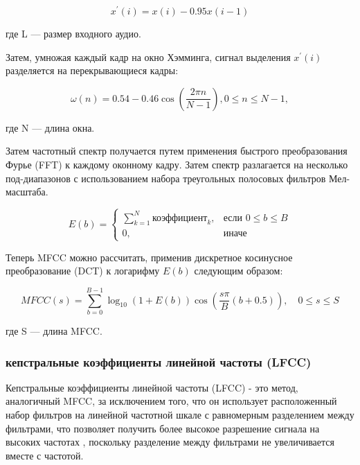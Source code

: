 \begin{equation}
    {x^'}(i) = x(i) - 0.95x(i-1)
\end{equation}

где L — размер входного аудио.

Затем, умножая каждый кадр на окно Хэмминга, сигнал выделения \({x^'}(i)\) разделяется на перекрывающиеся кадры:

\begin{equation}
    \omega(n) = 0.54 - 0.46 \cos(\frac{2 \pi n}{N - 1}), 0 \leq n \leq N - 1,
\end{equation}

где N — длина окна.

Затем частотный спектр получается путем применения быстрого преобразования Фурье (FFT) к каждому оконному кадру. Затем спектр разлагается на несколько под-диапазонов с использованием набора треугольных полосовых фильтров Мел-масштаба.

\begin{equation}
    E(b) = \left\{
    \begin{array}{ll}
    \sum_{k=1}^{N} \text{коэффициент}_k, & \text{если } 0 \leq b \leq B \\
    0, & \text{иначе}
    \end{array}
    \right.
\end{equation}

Теперь MFCC можно рассчитать, применив дискретное косинусное преобразование (DCT) к логарифму \(E(b)\) следующим образом:

\begin{equation}
    MFCC(s) = \sum_{b=0}^{B-1} \log_{10}(1 + E(b)) \cos\left(\frac{s\pi}{B} (b + 0.5)\right), \quad 0 \leq s \leq S
\end{equation}

где S — длина MFCC. 

\subsubsection{кепстральные коэффициенты линейной частоты (LFCC)}

Кепстральные коэффициенты линейной частоты (LFCC) - это метод, аналогичный MFCC, за исключением того, что он использует расположенный набор фильтров на линейной частотной шкале с равномерным разделением между фильтрами, что позволяет получить более высокое разрешение сигнала на высоких частотах \cite{lfcc-00}, поскольку разделение между фильтрами не увеличивается вместе с частотой.

